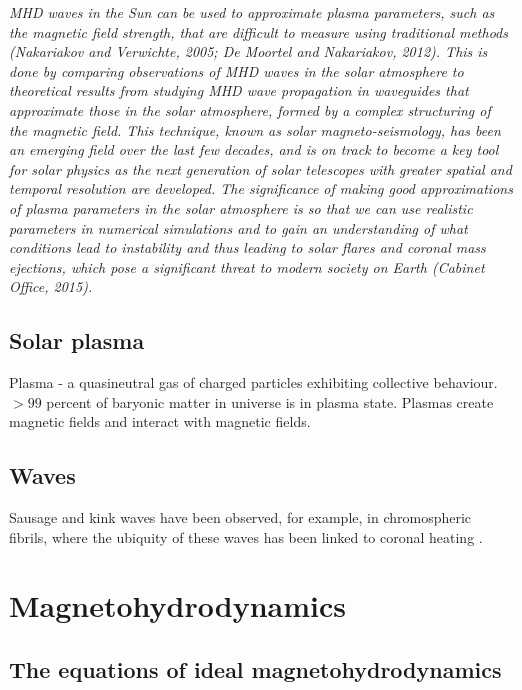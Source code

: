 \documentclass[12pt]{../style-files/ociamthesis}
\begin{document}
\textit{MHD waves in the Sun can be used to approximate plasma parameters, such as
	the magnetic field strength, that are difficult to measure using traditional methods
	(Nakariakov and Verwichte, 2005; De Moortel and Nakariakov, 2012). This is done
	by comparing observations of MHD waves in the solar atmosphere to theoretical results from studying MHD wave propagation in waveguides that approximate those
	in the solar atmosphere, formed by a complex structuring of the magnetic field. This
	technique, known as solar magneto-seismology, has been an emerging field over the
	last few decades, and is on track to become a key tool for solar physics as the next
	generation of solar telescopes with greater spatial and temporal resolution are developed. The significance of making good approximations of plasma parameters in the
	solar atmosphere is so that we can use realistic parameters in numerical simulations
	and to gain an understanding of what conditions lead to instability and thus leading
	to solar flares and coronal mass ejections, which pose a significant threat to modern
	society on Earth (Cabinet Office, 2015).}



\subsection{Solar plasma}
Plasma - a quasineutral gas of
charged particles
exhibiting
collective
behaviour.
$>99$ percent of baryonic
matter in universe
is in plasma state.
Plasmas create
magnetic fields
and interact with
magnetic fields.


\subsection{Waves}
Sausage and kink waves have been observed, for example, in chromospheric fibrils, where the ubiquity of these waves has been linked to coronal heating \citep{mor12}.

\section{Magnetohydrodynamics}
\label{sec: MHD}

\subsection{The equations of ideal magnetohydrodynamics} \label{sec: MHD eqns}
\end{document}
